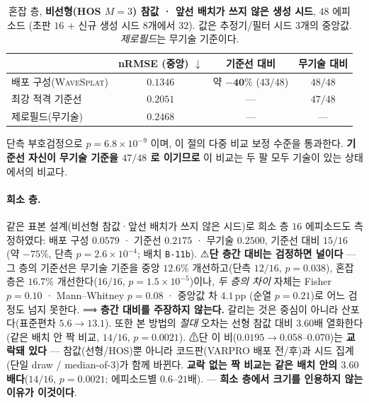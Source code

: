 \documentclass[11pt]{report}
\numberwithin{equation}{chapter}
\numberwithin{figure}{chapter}
\numberwithin{table}{chapter}
\newcommand{\WS}{\textsc{WaveSplat}}
\begin{document}
\begin{table}[htbp]
\centering
\caption{혼잡 층, \textbf{비선형(HOS $M{=}3$) 참값 · 앞선 배치가 쓰지 않은 생성 시드}, $48$ 에피소드
(초판 $16$ + 신규 생성 시드 $8$개에서 $32$). 값은 추정기/필터 시드 $3$개의 중앙값.
\emph{제로필드}는 무기술 기준이다.}
\label{tab:b11_hos}
\begin{tabular}{lccc}
\toprule
 & nRMSE (중앙) $\downarrow$ & 기준선 대비 & 무기술 대비 \\
\midrule
배포 구성(\WS{}) & $\mathbf{0.1346}$ & 약 $\mathbf{-40\%}$ ($43/48$) & $48/48$ \\
최강 적격 기준선  & $0.2051$ & --- & $47/48$ \\
제로필드(무기술)  & $0.2468$ & --- & --- \\
\bottomrule
\end{tabular}
\end{table}

단측 부호검정으로 $p = 6.8\times10^{-9}$ 이며, 이 절의 다중 비교 보정 수준을 통과한다.
\textbf{기준선 자신이 무기술 기준을 $47/48$ 로 이기므로} 이 비교는 두 팔 모두 기술이 있는
상태에서의 비교다.

\paragraph{희소 층.} 같은 표본 설계(비선형 참값·앞선 배치가 쓰지 않은 시드)로 희소 층 $16$ 에피소드도
측정하였다: 배포 구성 $0.0579$ · 기준선 $0.2175$ · 무기술 $0.2500$, 기준선 대비 $15/16$
(약 $-75\%$, 단측 $p = 2.6\times10^{-4}$; 배치 \texttt{B-11b}). ⚠\textbf{단 층간 대비는 검정하면 널이다} --- 그 층의 기준선은 무기술 기준을 중앙 $12.6\%$ 개선하고(단측 $12/16$, $p = 0.038$), 혼잡 층은 $16.7\%$ 개선한다($16/16$, $p = 1.5\times10^{-5}$)이나, \emph{두 층의 차이} 자체는 Fisher $p = 0.10$ · Mann--Whitney $p = 0.08$ · 중앙값 차 $4.1$\,pp (순열 $p = 0.21$)로 어느 검정도 넘지 못한다. ⟹ \textbf{층간 대비를 주장하지 않는다.} 갈리는 것은 중심이 아니라 산포다(표준편차 $5.6 \to 13.1$). 또한 본 방법의
\emph{절대} 오차는 선형 참값 대비 $3.60$배 열화한다(같은 배치 안 짝 비교, $14/16$,
$p = 0.0021$). ⚠단 이 비($0.0195 \to 0.058$--$0.070$)는 \textbf{교락돼 있다} --- 참값(선형/HOS)뿐 아니라 코드판(VARPRO 배포 전/후)과 시드 집계(단일 draw / median-of-3)가 함께 바뀐다. \textbf{교락 없는 짝 비교는 같은 배치 안의 $3.60$배다}($14/16$, $p = 0.0021$; 에피소드별 $0.6$--$21$배). ---
\textbf{희소 층에서 크기를 인용하지 않는 이유가 이것이다}.
\end{document}
